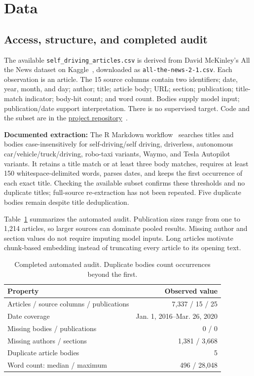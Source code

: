 \documentclass[conference]{IEEEtran}
\begin{document}
\section{Data}
\subsection{Access, structure, and completed audit}
The available \texttt{self\_driving\_articles.csv} is derived from David McKinley's All the News dataset on Kaggle~\cite{mckinley2021}, downloaded as \texttt{all-the-news-2-1.csv}. Each observation is an article. The 15 source columns contain two identifiers; date, year, month, and day; author; title; article body; URL; section; publication; title-match indicator; body-hit count; and word count. Bodies supply model input; publication/date support interpretation. There is no supervised target. Code and the subset are in the \href{https://github.com/laurengamber/DataMiningProject}{project repository}~\cite{projectcode}.

\textbf{Documented extraction:} The R Markdown workflow~\cite{extractioncode} searches titles and bodies case-insensitively for self-driving/self driving, driverless, autonomous car/vehicle/truck/driving, robo-taxi variants, Waymo, and Tesla Autopilot variants. It retains a title match or at least three body matches, requires at least 150 whitespace-delimited words, parses dates, and keeps the first occurrence of each exact title. Checking the available subset confirms these thresholds and no duplicate titles; full-source re-extraction has not been repeated. Five duplicate bodies remain despite title deduplication.

Table~\ref{tab:audit} summarizes the automated audit. Publication sizes range from one to 1,214 articles, so larger sources can dominate pooled results. Missing author and section values do not require imputing model inputs. Long articles motivate chunk-based embedding instead of truncating every article to its opening text.

\begin{table}[t]
\caption{Completed automated audit. Duplicate bodies count occurrences beyond the first.}
\label{tab:audit}
\centering
\begin{tabular}{@{}lr@{}}
\toprule
Property & Observed value \\
\midrule
Articles / source columns / publications & 7,337 / 15 / 25 \\
Date coverage & Jan. 1, 2016--Mar. 26, 2020 \\
Missing bodies / publications & 0 / 0 \\
Missing authors / sections & 1,381 / 3,668 \\
Duplicate article bodies & 5 \\
Word count: median / maximum & 496 / 28,048 \\
\bottomrule
\end{tabular}
\end{table}
\end{document}
